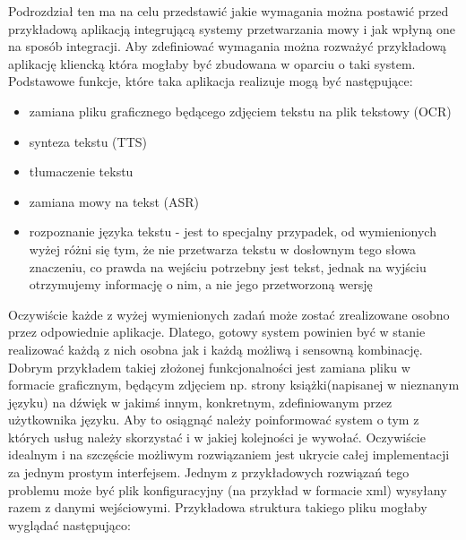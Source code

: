 Podrozdział ten ma na celu przedstawić  jakie wymagania można postawić przed przykładową aplikacją integrującą systemy przetwarzania mowy i jak wpłyną one na sposób integracji. Aby zdefiniować wymagania można rozważyć przykładową aplikację kliencką która mogłaby być zbudowana w oparciu o taki system. Podstawowe funkcje, które taka aplikacja realizuje mogą być następujące:
\begin{itemize}
	\item zamiana pliku graficznego będącego zdjęciem tekstu na plik tekstowy (OCR)
	\item synteza tekstu (TTS)
	\item tłumaczenie tekstu 
	\item zamiana mowy na tekst (ASR)
	\item rozpoznanie języka tekstu - jest to specjalny przypadek, od wymienionych wyżej różni się tym, że nie przetwarza tekstu w dosłownym tego słowa znaczeniu, co prawda na wejściu potrzebny jest tekst, jednak na wyjściu otrzymujemy informację o nim, a nie jego przetworzoną wersję
\end{itemize}
Oczywiście każde z wyżej wymienionych zadań może zostać zrealizowane osobno przez odpowiednie aplikacje. Dlatego, gotowy system powinien być w stanie realizować każdą z nich osobna jak i każdą możliwą i sensowną kombinację. Dobrym przykładem takiej złożonej funkcjonalności jest zamiana pliku w formacie graficznym, będącym zdjęciem np. strony książki(napisanej w nieznanym języku) na dźwięk w jakimś innym, konkretnym, zdefiniowanym przez użytkownika języku. Aby to osiągnąć należy poinformować system o tym z których usług należy skorzystać i w jakiej kolejności je wywołać. Oczywiście idealnym i na szczęście możliwym rozwiązaniem jest ukrycie całej implementacji za jednym prostym interfejsem. Jednym z przykładowych rozwiązań tego problemu może być plik konfiguracyjny (na przykład w formacie xml) wysyłany razem z danymi wejściowymi. Przykładowa struktura takiego pliku mogłaby wyglądać następująco:
